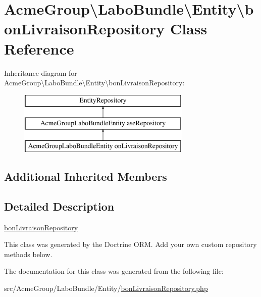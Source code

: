 \hypertarget{class_acme_group_1_1_labo_bundle_1_1_entity_1_1bon_livraison_repository}{\section{Acme\+Group\textbackslash{}Labo\+Bundle\textbackslash{}Entity\textbackslash{}bon\+Livraison\+Repository Class Reference}
\label{class_acme_group_1_1_labo_bundle_1_1_entity_1_1bon_livraison_repository}
}
Inheritance diagram for Acme\+Group\textbackslash{}Labo\+Bundle\textbackslash{}Entity\textbackslash{}bon\+Livraison\+Repository\+:\begin{figure}[H]
\begin{center}
\leavevmode
\includegraphics[height=3.000000cm]{class_acme_group_1_1_labo_bundle_1_1_entity_1_1bon_livraison_repository}
\end{center}
\end{figure}
\subsection*{Additional Inherited Members}


\subsection{Detailed Description}
\hyperlink{class_acme_group_1_1_labo_bundle_1_1_entity_1_1bon_livraison_repository}{bon\+Livraison\+Repository}

This class was generated by the Doctrine O\+R\+M. Add your own custom repository methods below. 

The documentation for this class was generated from the following file\+:\begin{DoxyCompactItemize}
\item 
src/\+Acme\+Group/\+Labo\+Bundle/\+Entity/\hyperlink{bon_livraison_repository_8php}{bon\+Livraison\+Repository.\+php}\end{DoxyCompactItemize}
